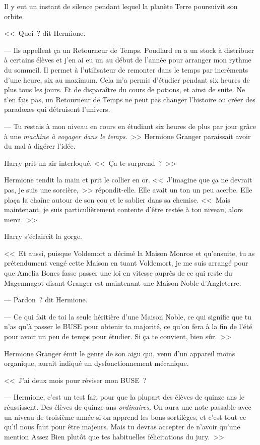 Il y eut un instant de silence pendant lequel la planète Terre poursuivit son orbite.

<<~Quoi~? dit Hermione.

--- Ils appellent ça un Retourneur de Temps. Poudlard en a un stock à distribuer à certains élèves et j'en ai eu un au début de l'année pour arranger mon rythme du sommeil. Il permet à l'utilisateur de remonter dans le temps par incréments d'une heure, six au maximum. Cela m'a permis d'étudier pendant six heures de plus tous les jours. Et de disparaître du cours de potions, et ainsi de suite. Ne t'en fais pas, un Retourneur de Temps ne peut pas changer l'histoire ou créer des paradoxes qui détruisent l'univers.

--- Tu restais à mon niveau en cours en étudiant six heures de plus par jour grâce à une \emph{machine à voyager dans le temps}.~>> Hermione Granger paraissait avoir du mal à digérer l'idée.

Harry prit un air interloqué. <<~Ça te surprend~?~>>

Hermione tendit la main et prit le collier en or. <<~J'imagine que ça ne devrait pas, je suis une sorcière,~>> répondit-elle. Elle avait un ton un peu acerbe. Elle plaça la chaîne autour de son cou et le sablier dans sa chemise. <<~Mais maintenant, je suis particulièrement contente d'être restée à ton niveau, alors merci.~>>

Harry s'éclaircit la gorge.

<<~Et aussi, puisque Voldemort a décimé la Maison Monroe et qu'ensuite, tu as prétendument vengé cette Maison en tuant Voldemort, je me suis arrangé pour que Amelia Bones fasse passer une loi en vitesse auprès de ce qui reste du Magenmagot disant Granger est maintenant une Maison Noble d'Angleterre.

--- Pardon~? dit Hermione.

--- Ce qui fait de toi la seule héritière d'une Maison Noble, ce qui signifie que tu n'as qu'à passer le BUSE pour obtenir ta majorité, ce qu'on fera à la fin de l'été pour avoir un peu de temps pour étudier. Si ça te convient, bien sûr.~>>

Hermione Granger émit le genre de son aigu qui, venu d'un appareil moins organique, aurait indiqué un dysfonctionnement mécanique.

<<~J'ai deux mois pour réviser mon BUSE~?

--- Hermione, c'est un test fait pour que la plupart des élèves de quinze ans le réussissent. Des élèves de quinze ans \emph{ordinaires}. On aura une note passable avec un niveau de troisième année si on apprend les bons sortilèges, et c'est tout ce qu'il nous faut pour être majeurs. Mais tu devras accepter de n'avoir qu'une mention Assez Bien plutôt que tes habituelles félicitations du jury.~>>

